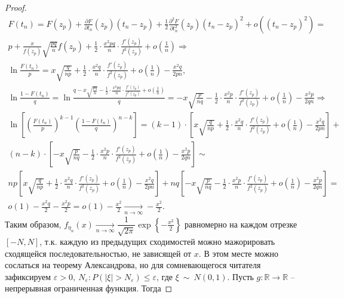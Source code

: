 \begin{proof}
\begin{gather*}
    F( t_{n}) =F( z_{p}) +\frac{\partial F}{\partial t_{n}}( z_{p})( t_{n} -z_{p}) +\frac{1}{2}\frac{\partial ^{2} F}{\partial t_{n}^{2}}( z_{p})( t_{n} -z_{p})^{2} +o\left(( t_{n} -z_{p})^{2}\right) =\\ p+\frac{x}{f( z_{p})}\sqrt{\frac{pq}{n}} f( z_{p}) +\frac{1}{2} \cdotp \frac{x^{2} pq}{n} \cdotp \frac{f'( z_{p})}{f^{2}( z_{p})} +o\left(\frac{1}{n}\right) \Rightarrow \\
    \ln\frac{F( t_{n})}{p} =x\sqrt{\frac{q}{np}} +\frac{1}{2} \cdotp \frac{x^{2} q}{n} \cdotp \frac{f'( z_{p})}{f^{2}( z_{p})} +o\left(\frac{1}{n}\right) -\frac{x^{2} q}{2pn} ,\\
    \ln\frac{1-F( t_{n})}{q} =\ln\frac{q-x\sqrt{\frac{pq}{n}} -\frac{1}{2} \cdotp \frac{x^{2} pq}{n} \cdotp \frac{f'( z_{p})}{f^{2}( z_{p})} +o\left(\frac{1}{n}\right)}{q} =-x\sqrt{\frac{p}{nq}} -\frac{1}{2} \cdotp \frac{x^{2} p}{n} \cdotp \frac{f'( z_{p})}{f^{2}( z_{p})} +o\left(\frac{1}{n}\right) -\frac{x^{2} p}{2qn} \Rightarrow \\
    \ln\left[\left(\frac{F( t_{n})}{p}\right)^{k-1}\left(\frac{1-F( t_{n})}{q}\right)^{n-k}\right] =( k-1) \cdotp \left[ x\sqrt{\frac{q}{np}} +\frac{1}{2} \cdotp \frac{x^{2} q}{n} \cdotp \frac{f'( z_{p})}{f^{2}( z_{p})} +o\left(\frac{1}{n}\right) -\frac{x^{2} q}{2pn}\right] +\\ ( n-k) \cdotp \left[ -x\sqrt{\frac{p}{nq}} -\frac{1}{2} \cdotp \frac{x^{2} p}{n} \cdotp \frac{f'( z_{p})}{f^{2}( z_{p})} +o\left(\frac{1}{n}\right) -\frac{x^{2} p}{2qn}\right]\sim\\ np\left[ x\sqrt{\frac{q}{np}} +\frac{1}{2} \cdotp \frac{x^{2} q}{n} \cdotp \frac{f'( z_{p})}{f^{2}( z_{p})} +o\left(\frac{1}{n}\right) -\frac{x^{2} q}{2pn}\right] +nq\left[ -x\sqrt{\frac{p}{nq}} -\frac{1}{2} \cdotp \frac{x^{2} p}{n} \cdotp \frac{f'( z_{p})}{f^{2}( z_{p})} +o\left(\frac{1}{n}\right) -\frac{x^{2} p}{2qn}\right] =\\ o( 1) -\frac{x^{2} q}{2} -\frac{x^{2} p}{2} =o( 1) -\frac{x^{2}}{2}\xrightarrow[n\rightarrow \infty ]{} -\frac{x^{2}}{2} .
\end{gather*}
Таким образом, $\displaystyle f_{\eta _{n}}( x)\xrightarrow[n\rightarrow \infty ]{}\dfrac{1}{\sqrt{2\pi }} \exp\left\{-\frac{x^{2}}{2}\right\}$ равномерно на каждом отрезке $\displaystyle [ -N,N]$, т.к. каждую из предыдущих сходимостей можно мажорировать сходящейся последовательностью, не зависящей от $\displaystyle x$. В этом месте можно сослаться на теорему Александрова, но для сомневающегося читателя зафиксируем $\displaystyle \varepsilon  >0,\ N_{\varepsilon } :P(| \xi |  >N_{\varepsilon }) \leqslant \varepsilon $, где $\displaystyle \xi \ \sim \ N( 0,1)$. Пусть $\displaystyle g:\mathbb{R}\rightarrow \mathbb{R}$ -- непрерывная ограниченная функция. Тогда



\end{proof}
